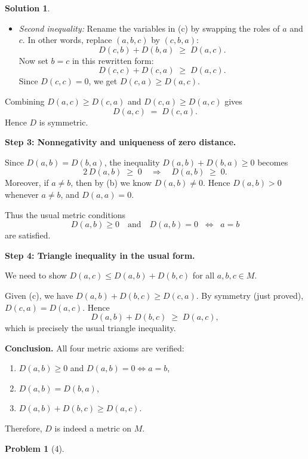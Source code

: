 \documentclass[12pt]{article}
\theoremstyle{definition} %
\newtheorem{solution}{Solution}
\newtheorem{problem}{Problem}
\theoremstyle{plain} %
\begin{document}
\begin{solution}
\begin{itemize}
    \item \emph{Second inequality:} Rename the variables in (c) by swapping the roles of $a$ and $c$. In other words, replace $(a,b,c)$ by $(c,b,a)$:
    \[
        D(c,b) + D(b,a) \;\ge\; D(a,c).
    \]
    Now set $b = c$ in this rewritten form:
    \[
        D(c,c) + D(c,a) \;\ge\; D(a,c).
    \]
    Since $D(c,c) = 0$, we get $D(c,a) \ge D(a,c)$.

\end{itemize}

Combining $D(a,c) \ge D(c,a)$ and $D(c,a) \ge D(a,c)$ gives 
\[
    D(a,c) \;=\; D(c,a).
\]
Hence $D$ is symmetric.

\medskip

\noindent \textbf{Step 3: Nonnegativity and uniqueness of zero distance.}

Since $D(a,b) = D(b,a)$, the inequality $D(a,b) + D(b,a) \ge 0$ becomes
\[
   2\,D(a,b) \;\ge\; 0 \quad\Longrightarrow\quad D(a,b) \;\ge\; 0.
\]
Moreover, if $a \neq b$, then by (b) we know $D(a,b) \neq 0$. Hence $D(a,b) > 0$ whenever $a \neq b$, and $D(a,a) = 0$.

Thus the usual metric conditions
\[
   D(a,b) \ge 0
   \quad\text{and}\quad
   D(a,b) = 0 \;\;\Leftrightarrow\;\; a = b
\]
are satisfied.

\medskip

\noindent \textbf{Step 4: Triangle inequality in the usual form.}

We need to show $D(a,c) \le D(a,b) + D(b,c)$ for all $a,b,c \in M$. 

Given (c), we have $D(a,b) + D(b,c) \ge D(c,a)$. By symmetry (just proved), $D(c,a) = D(a,c)$. Hence
\[
   D(a,b) + D(b,c) \;\ge\; D(a,c),
\]
which is precisely the usual triangle inequality.

\medskip

\noindent \textbf{Conclusion.} All four metric axioms are verified:

\begin{enumerate}
    \item $D(a,b) \ge 0$ and $D(a,b) = 0 \iff a = b$,
    \item $D(a,b) = D(b,a)$,
    \item $D(a,b) + D(b,c) \ge D(a,c)$.
\end{enumerate}

Therefore, $D$ is indeed a metric on $M$.

\end{solution}
\begin{problem}[4]
    
\end{problem}
\end{document}
